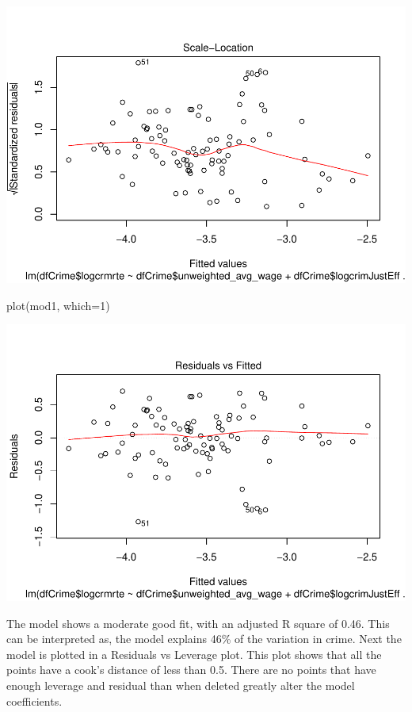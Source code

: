 \documentclass[]{article}
\newenvironment{Shaded}{}{}
\newcommand{\DataTypeTok}[1]{#1}
\newcommand{\DecValTok}[1]{#1}
\newcommand{\KeywordTok}[1]{\textcolor[rgb]{0.00,0.00,1.00}{#1}}
\newcommand{\NormalTok}[1]{#1}
\begin{document}
\includegraphics{Bagnard_Gaustad_Hartman_Leung_Lab_3_files/figure-latex/unnamed-chunk-83-1.pdf}

\begin{Shaded}
\begin{Highlighting}[]
\KeywordTok{plot}\NormalTok{(mod1, }\DataTypeTok{which=}\DecValTok{1}\NormalTok{)}
\end{Highlighting}
\end{Shaded}

\includegraphics{Bagnard_Gaustad_Hartman_Leung_Lab_3_files/figure-latex/unnamed-chunk-84-1.pdf}

The model shows a moderate good fit, with an adjusted R square of 0.46.
This can be interpreted as, the model explains 46\% of the variation in
crime. Next the model is plotted in a Residuals vs Leverage plot. This
plot shows that all the points have a cook's distance of less than 0.5.
There are no points that have enough leverage and residual than when
deleted greatly alter the model coefficients.
\end{document}
